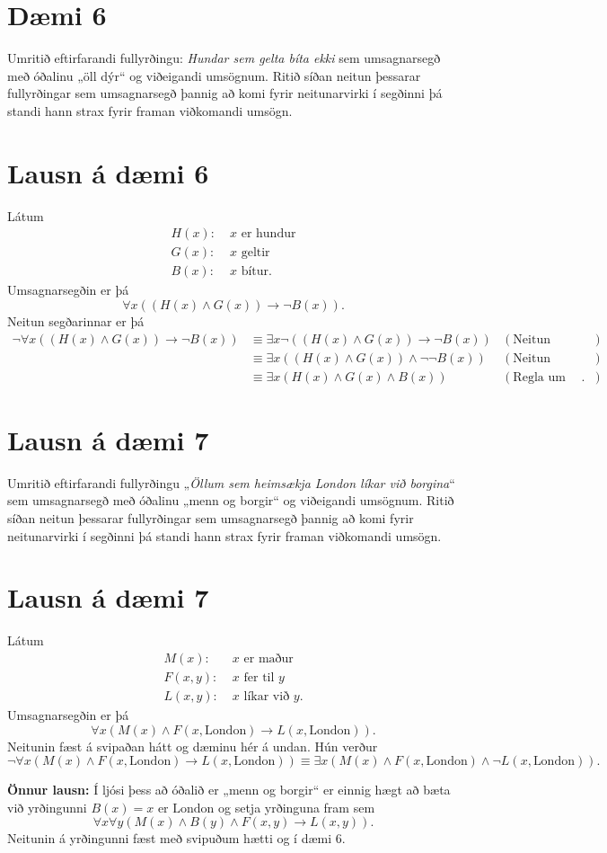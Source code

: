 \documentclass{article}
\begin{document}
\section*{Dæmi 6}
Umritið eftirfarandi fullyrðingu: \emph{Hundar sem gelta bíta ekki} sem umsagnarsegð með óðalinu „öll dýr“ og viðeigandi umsögnum. Ritið síðan neitun þessarar fullyrðingar sem umsagnarsegð þannig að komi fyrir neitunarvirki í segðinni þá standi hann strax fyrir framan viðkomandi umsögn.

\section*{Lausn á dæmi 6}
Látum
\begin{align*}
H(x): &\; \text{$x$ er hundur}\\
G(x): &\; \text{$x$ geltir}\\
B(x): &\; \text{$x$ bítur.}
\end{align*}
Umsagnarsegðin er þá
\[
\forall x((H(x)\land G(x))\to \neg B(x))\text{.}
\]
Neitun segðarinnar er þá
\begin{align*}
    \neg \forall x((H(x)\land G(x))\to \neg B(x)) &\equiv \exists x \neg((H(x)\land G(x))\to \neg B(x)) & (\text{Neitun almagnara})\\
    &\equiv \exists x ((H(x)\land G(x))\land \neg\neg B(x)) & (\text{Neitun leiðingar})\\
    &\equiv \exists x (H(x)\land G(x)\land B(x)) & (\text{Regla um tvöfalda neitun})\text{.}
\end{align*}

\section*{Lausn á dæmi 7}
Umritið eftirfarandi fullyrðingu „\emph{Öllum sem heimsækja London líkar við borgina}“ sem umsagnarsegð með óðalinu „menn og borgir“ og viðeigandi umsögnum. Ritið síðan neitun þessarar fullyrðingar sem umsagnarsegð þannig að komi fyrir neitunarvirki í segðinni þá standi hann strax fyrir framan viðkomandi umsögn.


\section*{Lausn á dæmi 7}
Látum
\begin{align*}
M(x): &\; \text{$x$ er maður}\\
F(x,y): &\; \text{$x$ fer til $y$}\\
L(x,y): &\; \text{$x$ líkar við $y$.}
\end{align*}
Umsagnarsegðin er þá
\[
\forall x(M(x)\land F(x,\text{London})\to L(x,\text{London}))\text{.}
\]
Neitunin fæst á svipaðan hátt og dæminu hér á undan. Hún verður
\[
\neg \forall x(M(x)\land F(x,\text{London})\to L(x,\text{London})) \equiv \exists x(M(x)\land F(x,\text{London})\land \neg L(x,\text{London}))\text{.}
\]

\noindent \textbf{Önnur lausn:} Í ljósi þess að óðalið er „menn og borgir“ er einnig hægt að bæta við yrðingunni $B(x)=\text{$x$ er London}$ og setja yrðinguna fram sem
\[
\forall x\forall y(M(x)\land B(y)\land F(x,y)\to L(x,y))\text{.}
\]
Neitunin á yrðingunni fæst með svipuðum hætti og í dæmi 6.
\end{document}
